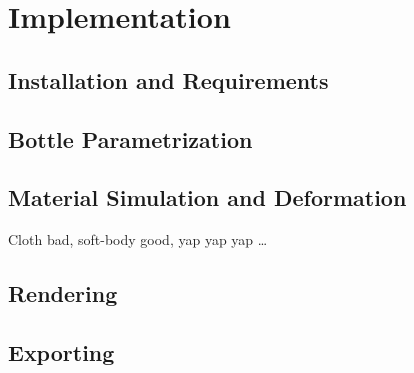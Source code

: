\chapter{Implementation}\label{ch:implementation}


\section{Installation and Requirements}\label{sec:installation-and-requirements}


\section{Bottle Parametrization}\label{sec:bottle-parametrization}


\section{Material Simulation and Deformation}\label{sec:material-simulation-and-deformation}

Cloth bad, soft-body good, yap yap yap \ldots 

\section{Rendering}\label{sec:rendering}


\section{Exporting}\label{sec:exporting}